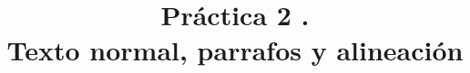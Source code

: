 \documentclass[12pt]{book}
\begin{document}
	\title{Práctica 2 .\\ Texto normal, parrafos y alineación }
	\maketitle
\end{document}
